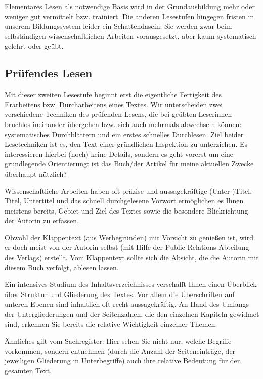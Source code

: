 \documentclass[]{book}
\theoremstyle{definition}
\theoremstyle{definition}
\theoremstyle{definition}
\theoremstyle{remark}
\begin{document}
Elementares Lesen als notwendige Basis wird in der Grundausbildung mehr
oder weniger gut vermittelt bzw. trainiert. Die anderen Lesestufen
hingegen fristen in unserem Bildungssystem leider ein Schattendasein:
Sie werden zwar beim selbständigen wissenschaftlichen Arbeiten
vorausgesetzt, aber kaum systematisch gelehrt oder geübt.

\subsection{Prüfendes Lesen}\label{prufendes-lesen}

Mit dieser zweiten Lesestufe beginnt erst die eigentliche Fertigkeit des
Erarbeitens bzw. Durcharbeitens eines Textes. Wir unterscheiden zwei
verschiedene Techniken des prüfenden Lesens, die bei geübten Leserinnen
bruchlos ineinander übergehen bzw. sich auch mehrmals abwechseln können:
systematisches Durchblättern und ein erstes schnelles Durchlesen. Ziel
beider Lesetechniken ist es, den Text einer gründlichen Inspektion zu
unterziehen. Es interessieren hierbei (noch) keine Details, sondern es
geht vorerst um eine grundlegende Orientierung: ist das Buch/der Artikel
für meine aktuellen Zwecke überhaupt nützlich?

Wissenschaftliche Arbeiten haben oft präzise und aussagekräftige
(Unter-)Titel. Titel, Untertitel und das schnell durchgelesene Vorwort
ermöglichen es Ihnen meistens bereits, Gebiet und Ziel des Textes sowie
die besondere Blickrichtung der Autorin zu erfassen.

Obwohl der Klappentext (aus Werbegründen) mit Vorsicht zu genießen ist,
wird er doch meist von der Autorin selbst (mit Hilfe der Public
Relations Abteilung des Verlags) erstellt. Vom Klappentext sollte sich
die Absicht, die die Autorin mit diesem Buch verfolgt, ablesen lassen.

Ein intensives Studium des Inhaltsverzeichnisses verschafft Ihnen einen
Überblick über Struktur und Gliederung des Textes. Vor allem die
Überschriften auf unteren Ebenen sind inhaltlich oft recht
aussagekräftig. An Hand des Umfangs der Untergliederungen und der
Seitenzahlen, die den einzelnen Kapiteln gewidmet sind, erkennen Sie
bereits die relative Wichtigkeit einzelner Themen.

Ähnliches gilt vom Sachregister: Hier sehen Sie nicht nur, welche
Begriffe vorkommen, sondern entnehmen (durch die Anzahl der
Seiteneinträge, der jeweiligen Gliederung in Unterbegriffe) auch ihre
relative Bedeutung für den gesamten Text.
\end{document}
